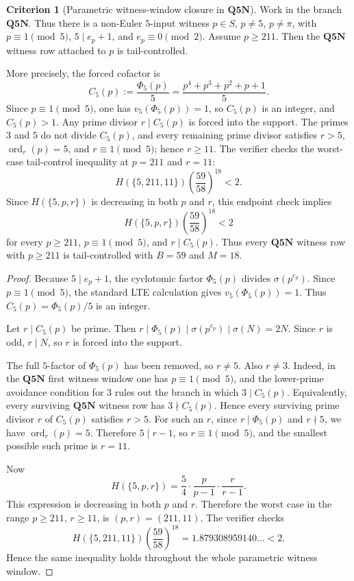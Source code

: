 \documentclass[11pt]{article}
\theoremstyle{definition}
\newtheorem{criterion}[theorem]{Criterion}
\theoremstyle{remark}
\begin{document}
\begin{criterion}[Parametric witness-window closure in \texorpdfstring{\(\mathbf{Q5N}\)}{Q5N}]
\label{crit:q5n-parametric-witness-window-closure}
Work in the branch \(\mathbf{Q5N}\).  Thus there is a non-Euler \(5\)-input
witness \(p\in S\), \(p\ne5\), \(p\ne\pi\), with \(p\equiv1\pmod5\),
\(5\mid e_p+1\), and \(e_p\equiv0\pmod2\).  Assume \(p\ge211\).  Then the
\(\mathbf{Q5N}\) witness row attached to \(p\) is tail-controlled.

More precisely, the forced cofactor is
\[
  C_5(p)
  :=
  \frac{\Phi_5(p)}5
  =
  \frac{p^4+p^3+p^2+p+1}{5}.
\]
Since \(p\equiv1\pmod5\), one has \(v_5(\Phi_5(p))=1\), so \(C_5(p)\) is an
integer, and \(C_5(p)>1\).  Any prime divisor \(r\mid C_5(p)\) is forced into
the support.  The primes \(3\) and \(5\) do not divide
\(C_5(p)\), and every remaining prime divisor satisfies
\(r>5\), \(\operatorname{ord}_r(p)=5\), and \(r\equiv1\pmod5\); hence
\(r\ge11\).  The verifier checks the worst-case tail-control inequality at
\(p=211\) and \(r=11\):
\[
  H(\{5,211,11\})
  \left(\frac{59}{58}\right)^{18}
  <2.
\]
Since \(H(\{5,p,r\})\) is decreasing in both \(p\) and \(r\), this endpoint
check implies
\[
  H(\{5,p,r\})
  \left(\frac{59}{58}\right)^{18}
  <2
\]
for every \(p\ge211\), \(p\equiv1\pmod5\), and \(r\mid C_5(p)\).  Thus every
\(\mathbf{Q5N}\) witness row with \(p\ge211\) is tail-controlled with \(B=59\)
and \(M=18\).
\end{criterion}

\begin{proof}
Because \(5\mid e_p+1\), the cyclotomic factor \(\Phi_5(p)\) divides
\(\sigma(p^{e_p})\).  Since \(p\equiv1\pmod5\), the standard LTE calculation
gives \(v_5(\Phi_5(p))=1\).  Thus \(C_5(p)=\Phi_5(p)/5\) is an integer.

Let \(r\mid C_5(p)\) be prime.  Then
\(r\mid\Phi_5(p)\mid\sigma(p^{e_p})\mid\sigma(N)=2N\).  Since \(r\) is odd,
\(r\mid N\), so \(r\) is forced into the support.

The full \(5\)-factor of \(\Phi_5(p)\) has been removed, so
\(r\ne5\).  Also \(r\ne3\).  Indeed, in the \(\mathbf{Q5N}\) first witness window one has
\(p\equiv1\pmod5\), and the lower-prime avoidance condition for \(3\) rules out
the branch in which \(3\mid C_5(p)\).  Equivalently, every surviving
\(\mathbf{Q5N}\) witness row has \(3\nmid C_5(p)\).  Hence every surviving
prime divisor \(r\) of \(C_5(p)\) satisfies \(r>5\).  For such an \(r\), since
\(r\mid\Phi_5(p)\) and \(r\nmid5\), we have \(\operatorname{ord}_r(p)=5\).
Therefore \(5\mid r-1\), so \(r\equiv1\pmod5\), and the smallest possible such
prime is \(r=11\).

Now
\[
  H(\{5,p,r\})
  =
  \frac54\cdot\frac{p}{p-1}\cdot\frac{r}{r-1}.
\]
This expression is decreasing in both \(p\) and \(r\).  Therefore the worst case
in the range \(p\ge211\), \(r\ge11\), is \((p,r)=(211,11)\).
The verifier checks
\[
  H(\{5,211,11\})
  \left(\frac{59}{58}\right)^{18}
  =
  1.879308959140\ldots
  <2.
\]
Hence the same inequality holds throughout the whole parametric witness window.
\end{proof}
\end{document}
